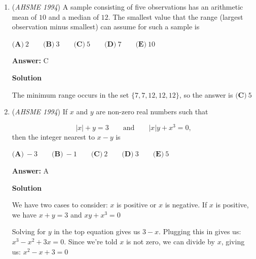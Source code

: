 \begin{enumerate}
\textbf{Solution 2}

Consider the small rectangle between $x=3$ and $x=5$ with area $2$.  If we exclude that area then the shape becomes a much simpler, its just a rectangle.  In order to offset the exclusion of that area from the shape below the line, we must also exclude a shape with the same area above the line.  We want the remainder after excluding both areas to be  simple, so exclude a rectangle between $x=0$ and $x=3$ and $y=3$ and $y=c$ for some unknown $c$.  For the area to be the same we need $(3-c) \cdot 3 = 2$, or $c=7/3$.  After excluding our two offsetting areas, we're left with a rectangle from $x=0$ to $x=3$ and $y=0$ to $y=c$.  The area of this region is clearly bisected by its diagonal line.  The line passes through $(0,0)$ and $(3,c)$ so its slope is $c/3 = 7/9$ and the answer is $\fbox{E}$



	\item (\textit{AHSME 1994}) A sample consisting of five observations has an arithmetic mean of $10$ and a median of $12$. The smallest value that the range (largest observation minus smallest) can assume for such a sample is


 $\textbf{(A)}\ 2 \qquad\textbf{(B)}\ 3 \qquad\textbf{(C)}\ 5 \qquad\textbf{(D)}\ 7 \qquad\textbf{(E)}\ 10$

 \textbf{Answer: }C



\textbf{Solution}

The minimum range occurs in the set $\{7,7,12,12,12\}$, so the answer is $\boxed{\textbf{(C)}\ 5}$



	\item (\textit{AHSME 1994}) If $x$ and $y$ are non-zero real numbers such that

 \[|x|+y=3 \qquad \text{and} \qquad |x|y+x^3=0,\]
then the integer nearest to $x-y$ is


 $\textbf{(A)}\ -3 \qquad\textbf{(B)}\ -1 \qquad\textbf{(C)}\ 2 \qquad\textbf{(D)}\ 3 \qquad\textbf{(E)}\ 5$

 \textbf{Answer: }A



\textbf{Solution}

We have two cases to consider: $x$ is positive or $x$ is negative. If $x$ is positive, we have $x+y=3$ and $xy+x^3=0$

 Solving for $y$ in the top equation gives us $3-x$. Plugging this in gives us: $x^3-x^2+3x=0$.  Since we're told $x$ is not zero, we can divide by $x$, giving us: $x^2-x+3=0$


\end{enumerate}
